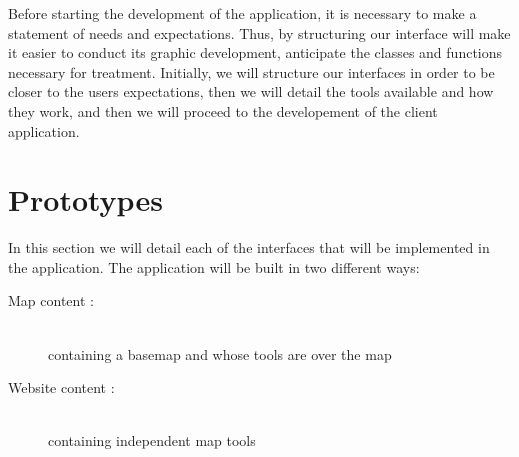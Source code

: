 

Before starting the development of the application, it is necessary to make a statement of needs and expectations. Thus, by structuring our interface will make it easier to conduct its graphic development, anticipate the classes and functions necessary for treatment. Initially, we will structure our interfaces in order to be closer to the users expectations, then we will detail the tools available and how they work, and then we will proceed to the developement of the client application.


\section{Prototypes}


In this section we will detail each of the interfaces that will be implemented in the application. The application will be built in two different ways:
\begin{description}
  \item[Map content :] \hfill \\ containing a basemap and whose tools are over the map
  \item[Website content :] \hfill \\ containing independent map tools
\end{description}

